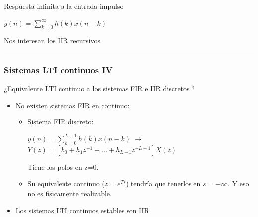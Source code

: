 \begin{frame}
\begin{itemize}
\begin{itemize}
\hspace{2.2cm}Respuesta infinita a la entrada impulso  

 \vspace{0.1cm}

{\footnotesize \hspace{2.2cm}$y(n)=\sum_{k=0}^{\infty} h(k)x(n-k)$}


 \vspace{0.1cm}

\hspace{2.2cm}Nos interesan los IIR recursivos


\end{itemize}



\end{itemize}


\vspace{-0,4cm}

\rule{12cm}{0.4pt}


\vspace{0,2cm}


\end{frame}



\begin{frame}
\frametitle{Sistemas LTI continuos IV}

\small
¿Equivalente LTI continuo a los sistemas FIR e IIR discretos ?

\begin{itemize}
\item No existen sistemas FIR en continuo:
\begin{itemize}
\item \small Sistema FIR discreto:

\vspace{0.1cm}

{\footnotesize $y(n)\!=\!\sum_{k=0}^{L-1} \!h(k)x(n\!-\!k)$ $\rightarrow$   $Y(z)\!=\![h_0\!+\!h_1z^{-1}\!\!+\!...\!+\!h_{L\!-\!1}z^{-L+1}]X(z)$}

\vspace{0.2cm}

Tiene los polos en z=0. 

\vspace{0.2cm}

\item Su equivalente  continuo ($z=e^{Ts}$) tendría que tenerlos en $s=-\infty$. Y eso no es fisicamente realizable.
 

\vspace{0.1cm}

\end{itemize}

\item Los sistemas LTI continuos estables son IIR
\end{itemize}

\end{frame}

